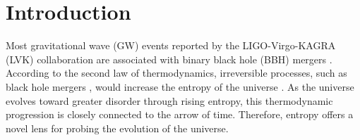 \documentclass[twocolumn]{aastex631}
\begin{document}
\begin{abstract}



\end{abstract}



\section{Introduction} \label{sec:intro}

Most gravitational wave (GW) events reported by the LIGO-Virgo-KAGRA (LVK) collaboration are associated with binary black hole (BBH) mergers \citep{LIGOScientific:2016vlm, yunes2024gravitationalwavetestsgeneralrelativity}.
According to the second law of thermodynamics, irreversible processes, such as black hole mergers \citep{Kephart_2003}, would increase the entropy of the universe \citep{PhysRevD.7.2333}. As the universe evolves toward greater disorder through rising entropy, this thermodynamic progression is closely connected to the arrow of time. Therefore, entropy offers a novel lens for probing the evolution of the universe. 
\end{document}
